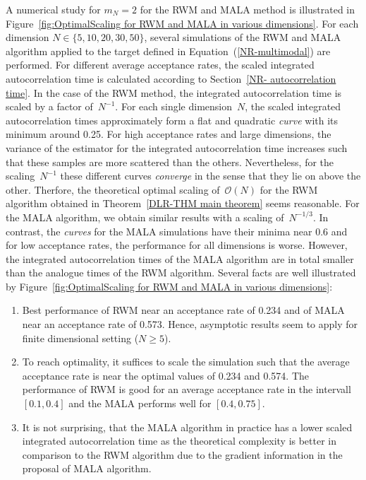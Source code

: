 A numerical study for $m_N = 2$ for the RWM and MALA method is illustrated in Figure~\ref{fig:OptimalScaling for RWM and MALA in various dimensions}. For each dimension $N \in \{ 5, 10, 20, 30, 50 \}$, several simulations of the RWM and MALA algorithm applied to the target defined in Equation~(\ref{NR-multimodal}) are performed. For different average acceptance rates, the scaled integrated autocorrelation time is calculated according to Section~\ref{NR- autocorrelation time}. In the case of the RWM method, the integrated autocorrelation time is scaled by a factor of~$N^{-1}$.  For each single dimension~$N$, the scaled integrated autocorrelation times approximately form a flat and quadratic \textit{curve} with its minimum around 0.25. For high acceptance rates and large dimensions, the variance of the estimator for the integrated autocorrelation time increases such that these samples are more scattered than the others. Nevertheless, for the scaling~$N^{-1}$ these different curves \textit{converge} in the sense that they lie on above the other. Therfore, the theoretical optimal scaling of~$\mathcal{O}(N)$ for the RWM algorithm obtained in Theorem~\ref{DLR-THM main theorem} seems reasonable. For the MALA algorithm, we obtain similar results with a scaling of~$N^{-1/3}$. In contrast, the \textit{curves} for the MALA simulations have their minima near 0.6 and for low acceptance rates, the performance for all dimensions is worse. However, the integrated autocorrelation times of the MALA algorithm are in total smaller than the analogue times of the RWM algorithm. Several facts are well illustrated by Figure~\ref{fig:OptimalScaling for RWM and MALA in various dimensions}:
\begin{enumerate}
 \item Best performance of RWM near an acceptance rate of 0.234 and of MALA near an acceptance rate of 0.573. Hence, asymptotic results seem to apply for finite dimensional setting ($N \geq 5$).
 \item To reach optimality, it suffices to scale the simulation such that the average acceptance rate is near the optimal values of 0.234 and 0.574. The performance of RWM is good for an average acceptance rate in the intervall $[0.1, 0.4]$ and the MALA performs well for $[0.4, 0.75]$.
 \item It is not surprising, that the MALA algorithm  in practice has a lower scaled integrated autocorrelation time as the theoretical complexity is better in comparison to the RWM algorithm due to the gradient information in the proposal of MALA algorithm.
\end{enumerate}


